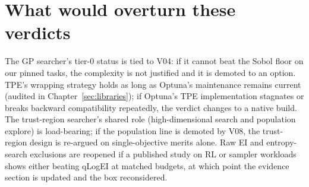 \section{What would overturn these verdicts}

The GP searcher's tier-0 status is tied to V04: if it cannot beat
the Sobol floor on our pinned tasks, the complexity is not justified
and it is demoted to an option. TPE's wrapping strategy holds as
long as Optuna's maintenance remains current (audited in
Chapter~\ref{sec:libraries}); if Optuna's TPE implementation
stagnates or breaks backward compatibility repeatedly, the verdict
changes to a native build. The trust-region searcher's shared role
(high-dimensional search and population explore) is load-bearing; if
the population line is demoted by V08, the trust-region design is
re-argued on single-objective merits alone. Raw EI and
entropy-search exclusions are reopened if a published study on RL or
sampler workloads shows either beating qLogEI at matched budgets, at
which point the evidence section is updated and the box reconsidered.
